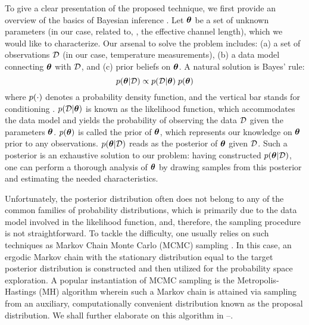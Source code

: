 To give a clear presentation of the proposed technique, we first provide an overview of the basics of Bayesian inference \cite{gelman2004}.
Let ${\boldsymbol\theta}$ be a set of unknown parameters (in our case, related to, \eg, the effective channel length), which we would like to characterize. Our arsenal to solve the problem includes: (a) a set of observations $\mathcal{D}$ (in our case, temperature measurements), (b) a data model connecting ${\boldsymbol\theta}$ with $\mathcal{D}$, and (c) prior beliefs on ${\boldsymbol\theta}$. A natural solution is Bayes' rule:
\begin{equation} \elabel{bayes}
  \f{\vparam | \Data} \propto \f{\Data | \vparam} \; \f{\vparam}
\end{equation}
where $\f{\cdot}$ denotes a probability density function, and the vertical bar stands for conditioning \cite{durrett2010}.
$\f{\Data | \vparam}$ is known as the likelihood function, which accommodates the data model and yields the probability of observing the data $\mathcal{D}$ given the parameters ${\boldsymbol\theta}$.
$\f{\vparam}$ is called the prior of ${\boldsymbol\theta}$, which represents our knowledge on ${\boldsymbol\theta}$ prior to any observations.
$\f{\vparam | \Data}$ reads as the posterior of ${\boldsymbol\theta}$ given $\mathcal{D}$. Such a posterior is an exhaustive solution to our problem: having constructed $\f{\vparam | \Data}$, one can perform a thorough analysis of ${\boldsymbol\theta}$ by drawing samples from this posterior and estimating the needed characteristics.

Unfortunately, the posterior distribution often does not belong to any of the common families of probability distributions, which is primarily due to the data model involved in the likelihood function, and, therefore, the sampling procedure is not straightforward.
To tackle the difficulty, one usually relies on such techniques as Markov Chain Monte Carlo (MCMC) sampling \cite{gelman2004}. In this case, an ergodic Markov chain with the stationary distribution equal to the target posterior distribution is constructed and then utilized for the probability space exploration.
A popular instantiation of MCMC sampling is the Metropolis-Hastings (MH) algorithm wherein such a Markov chain is attained via sampling from an auxiliary, computationally convenient distribution known as the proposal distribution. We shall further elaborate on this algorithm in --.
